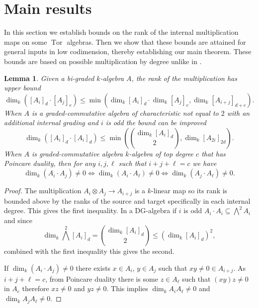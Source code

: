\documentclass[reqno]{amsart}
\DeclareMathOperator{\rank}{dim}
\DeclareMathOperator{\Tor}{Tor}
\newcommand{\sube}{\subseteq}
\theoremstyle{plain} %
\newtheorem{lemma}[theorem]{Lemma}
\theoremstyle{definition}
\theoremstyle{remark}
\begin{document}
\section{Main results}

In this section we establish bounds on the rank of the internal multiplication maps on some $\Tor$ algebras. Then we show that these bounds are attained for general inputs in low codimension, thereby establishing our main theorem. These bounds are based on possible multiplication by degree unlike in \cite{LinkageClasses}.

\begin{lemma}\label{General-bounds}
    Given a  bi-graded $k$-algebra $A$, the rank of the multiplication has upper bound
    \begin{equation}\label{alg_bound_eq}
        \dim_k ([A_i]_d\cdot [A_j]_e) \leq \min(\dim_k [A_i]_d\cdot \dim_k[A_j]_e, \dim_k[A_{i+j}]_{d+e}) .
    \end{equation}
When $A$ is a graded-commutative algebra of characteristic not equal to $2$ with an additional internal grading and $i$ is odd the bound can be improved 
\begin{equation}\label{DG_bound_eq}
    \dim_k ([A_i]_d\cdot [A_i]_d) \leq \min\left(\textstyle \binom{\dim_k [A_i]_d}{ 2}\displaystyle, \dim_k[A_{2i}]_{2d}\right) .
\end{equation}
When $A$ is graded-commutative algebra $k$-algebra of top degree $c$ that has Poincare duality, then for any $i,j,\ell$ such that $i+j+\ell =c$ we have  
\begin{equation}\label{exception Poincare}
\rank_k(A_i\cdot A_j)\neq0\iff \rank_k(A_i\cdot A_\ell)\neq0\iff\rank_k(A_j\cdot A_\ell)\neq0.
\end{equation}
\end{lemma} 

\begin{proof}
    The multiplication $A_i\otimes A_j\to A_{i+j}$  is a $k$-linear map so its rank is bounded above by the ranks of the source and target specifically in each internal degree. This gives the first inequality. In a DG-algebra if $i$ is odd $A_i\cdot A_i\sube \bigwedge^2A_i$ and since $$\dim_k \bigwedge ^2[A_i]_d= \binom{\dim_k[A_i]_d}{ 2}\leq \left(\dim_k[A_i]_d\right)^2,$$ combined with the first inequality this gives the second. 

    If $\rank_k(A_i\cdot A_j)\neq0$ there exists $x\in A_i$, $y\in A_j$ such that $xy\neq 0\in A_{i+j}$. As $i+j+\ell =c$, from Poincare duality there is some $z\in A_\ell$ such that $(xy)z \neq 0$ in $A_c$ therefore $xz\neq 0$ and $yz\neq 0$. This implies $\rank_k A_iA_\ell \neq 0$ and $\rank_k A_jA_\ell\neq0$.
\end{proof}
\end{document}
